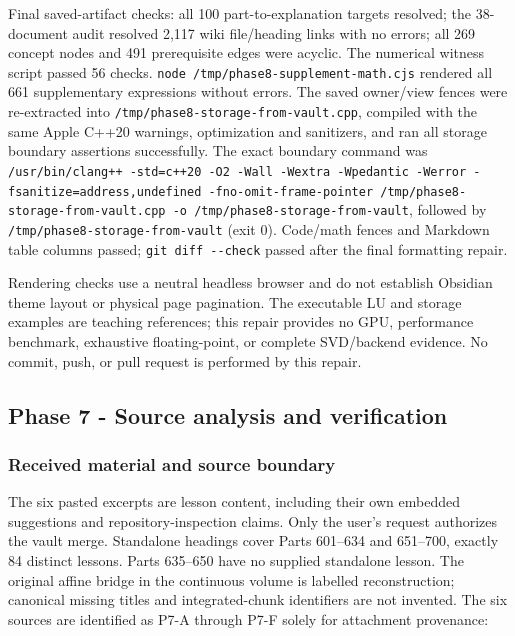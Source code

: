 Final saved-artifact checks: all 100 part-to-explanation targets resolved; the 38-document audit resolved 2,117 wiki file/heading links with no errors; all 269 concept nodes and 491 prerequisite edges were acyclic. The numerical witness script passed 56 checks. \texttt{node\ /tmp/phase8-supplement-math.cjs} rendered all 661 supplementary expressions without errors. The saved owner/view fences were re-extracted into \texttt{/tmp/phase8-storage-from-vault.cpp}, compiled with the same Apple C++20 warnings, optimization and sanitizers, and ran all storage boundary assertions successfully. The exact boundary command was \texttt{/usr/bin/clang++\ -std=c++20\ -O2\ -Wall\ -Wextra\ -Wpedantic\ -Werror\ -fsanitize=address,undefined\ -fno-omit-frame-pointer\ /tmp/phase8-storage-from-vault.cpp\ -o\ /tmp/phase8-storage-from-vault}, followed by \texttt{/tmp/phase8-storage-from-vault} (exit 0). Code/math fences and Markdown table columns passed; \texttt{git\ diff\ -\/-check} passed after the final formatting repair.

Rendering checks use a neutral headless browser and do not establish Obsidian theme layout or physical page pagination. The executable LU and storage examples are teaching references; this repair provides no GPU, performance benchmark, exhaustive floating-point, or complete SVD/backend evidence. No commit, push, or pull request is performed by this repair.

\subsection{Phase 7 - Source analysis and verification}\label{appendix-a103e7846d21-phase-7---source-analysis-and-verification}

\subsubsection{Received material and source boundary}\label{appendix-a103e7846d21-received-material-and-source-boundary}

The six pasted excerpts are lesson content, including their own embedded suggestions and repository-inspection claims. Only the user's request authorizes the vault merge. Standalone headings cover Parts 601--634 and 651--700, exactly 84 distinct lessons. Parts 635--650 have no supplied standalone lesson. The original affine bridge in the continuous volume is labelled reconstruction; canonical missing titles and integrated-chunk identifiers are not invented. The six sources are identified as P7-A through P7-F solely for attachment provenance:

